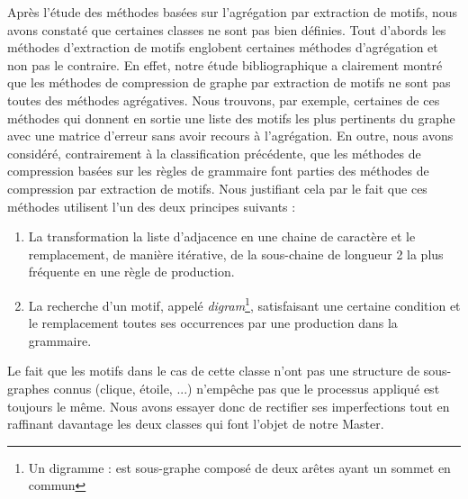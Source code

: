 
Après l'étude des méthodes basées sur l'agrégation par extraction de motifs, nous avons constaté que certaines classes ne sont pas bien définies. Tout d'abords les méthodes d'extraction de motifs englobent certaines méthodes d'agrégation et non pas le contraire. En effet, notre étude bibliographique a clairement montré que les méthodes de compression de graphe par extraction de motifs ne sont pas toutes des méthodes agrégatives. Nous trouvons, par exemple, certaines de ces méthodes qui donnent en sortie une liste des motifs les plus pertinents du graphe avec une matrice d'erreur sans avoir recours à l'agrégation. 
En outre, nous avons considéré, contrairement à la classification précédente, que les méthodes de compression basées sur les règles de grammaire font parties des méthodes de compression par extraction de motifs. Nous justifiant cela par le fait que ces méthodes utilisent l'un des deux principes suivants : 
\begin{enumerate}
\item La transformation la liste d'adjacence en une chaine de caractère et le remplacement, de manière itérative, de la sous-chaine de longueur 2 la plus fréquente en une règle de production.
\item La recherche d'un motif, appelé \textit{digram}\footnote{Un digramme : est sous-graphe composé de deux arêtes ayant un sommet en commun}, satisfaisant une certaine condition et le remplacement toutes ses occurrences par une production dans la grammaire. 
\end{enumerate}
Le fait que les motifs dans le cas de cette classe n'ont pas une structure de sous-graphes connus (clique, étoile, ...) n'empêche pas que le processus appliqué est toujours le même. Nous avons essayer donc de rectifier ses imperfections tout en raffinant davantage les deux classes qui font l'objet de notre Master. 

